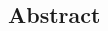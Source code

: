 
\renewcommand{\title}[1]{\chapter{#1}}
\renewcommand{\author}[2][]{{\Gotham\large{#2\textsuperscript{#1}}~~}}

\renewcommand{\affil}[2][]{{\noindent\footnotesize{#1}~~#2 \\}}

\patchcmd{\thebibliography}{\chapter*}{\section*}{}{}

\begin{spacing}{1}



\section*{Abstract}



\end{spacing}

\newpage



\begin{spacing}{1}




\end{spacing}


